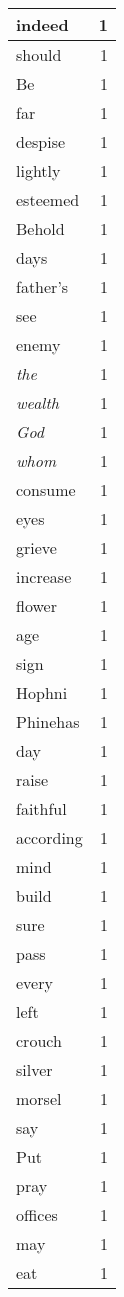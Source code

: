 \begin{center}
\begin{longtable}{l|r}
indeed & 1 \\ \hline
should & 1 \\ \hline
Be & 1 \\ \hline
far & 1 \\ \hline
despise & 1 \\ \hline
lightly & 1 \\ \hline
esteemed & 1 \\ \hline
Behold & 1 \\ \hline
days & 1 \\ \hline
father's & 1 \\ \hline
see & 1 \\ \hline
enemy & 1 \\ \hline
\emph{the} & 1 \\ \hline
\emph{wealth} & 1 \\ \hline
\emph{God} & 1 \\ \hline
\emph{whom} & 1 \\ \hline
consume & 1 \\ \hline
eyes & 1 \\ \hline
grieve & 1 \\ \hline
increase & 1 \\ \hline
flower & 1 \\ \hline
age & 1 \\ \hline
sign & 1 \\ \hline
Hophni & 1 \\ \hline
Phinehas & 1 \\ \hline
day & 1 \\ \hline
raise & 1 \\ \hline
faithful & 1 \\ \hline
according & 1 \\ \hline
mind & 1 \\ \hline
build & 1 \\ \hline
sure & 1 \\ \hline
pass & 1 \\ \hline
every & 1 \\ \hline
left & 1 \\ \hline
crouch & 1 \\ \hline
silver & 1 \\ \hline
morsel & 1 \\ \hline
say & 1 \\ \hline
Put & 1 \\ \hline
pray & 1 \\ \hline
offices & 1 \\ \hline
may & 1 \\ \hline
eat & 1 \\ \hline
\end{longtable}
\end{center}



